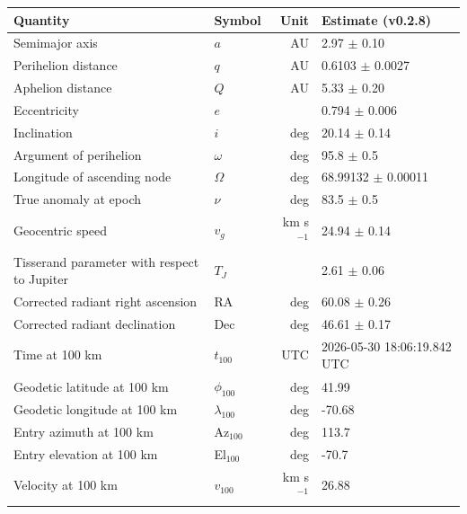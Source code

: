 \begin{tabular}{llrl}
\toprule
Quantity & Symbol & Unit & Estimate {\footnotesize (v0.2.8)} \\
\midrule
Semimajor axis & $a$ & AU & 2.97 $\pm$ 0.10 \\
Perihelion distance & $q$ & AU & 0.6103 $\pm$ 0.0027 \\
Aphelion distance & $Q$ & AU & 5.33 $\pm$ 0.20 \\
Eccentricity & $e$ &  & 0.794 $\pm$ 0.006 \\
Inclination & $i$ & deg & 20.14 $\pm$ 0.14 \\
Argument of perihelion & $\omega$ & deg & 95.8 $\pm$ 0.5 \\
Longitude of ascending node & $\Omega$ & deg & 68.99132 $\pm$ 0.00011 \\
True anomaly at epoch & $\nu$ & deg & 83.5 $\pm$ 0.5 \\
Geocentric speed & $v_g$ & km s$^{-1}$ & 24.94 $\pm$ 0.14 \\
Tisserand parameter with respect to Jupiter & $T_J$ &  & 2.61 $\pm$ 0.06 \\
Corrected radiant right ascension & RA & deg & 60.08 $\pm$ 0.26 \\
Corrected radiant declination & Dec & deg & 46.61 $\pm$ 0.17 \\
Time at 100 km & $t_{100}$ & UTC & 2026-05-30 18:06:19.842 UTC \\
Geodetic latitude at 100 km & $\phi_{100}$ & deg & 41.99 \\
Geodetic longitude at 100 km & $\lambda_{100}$ & deg & -70.68 \\
Entry azimuth at 100 km & Az$_{100}$ & deg & 113.7 \\
Entry elevation at 100 km & El$_{100}$ & deg & -70.7 \\
Velocity at 100 km & $v_{100}$ & km s$^{-1}$ & 26.88 \\
\bottomrule
\end{tabular}
